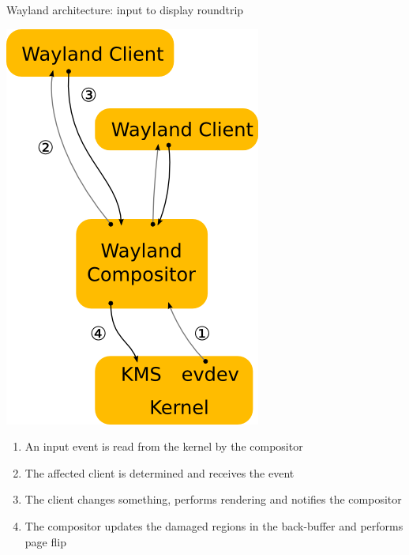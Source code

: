 \begin{frame}{Wayland architecture: input to display roundtrip}
  \begin{minipage}{0.49\textwidth}
    \centering
    \includegraphics[height=0.8\textwidth]{slides/graphics-software/wayland-architecture-roundtrip.png}
  \end{minipage}
  \hfill
  \begin{minipage}{0.49\textwidth}
    \begin{enumerate}
    \item An input event is read from the kernel by the compositor
    \item The affected client is determined and receives the event
    \item The client changes something, performs rendering and notifies the compositor
    \item The compositor updates the damaged regions in the back-buffer and performs page flip
    \end{enumerate}
  \end{minipage}
\end{frame}

